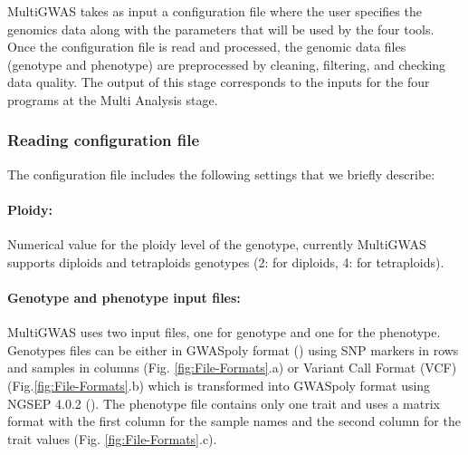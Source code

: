 \documentclass{article}
\begin{document}
MultiGWAS takes as input a configuration file where the user specifies the genomics data along with the parameters that will be used by the four tools. Once the configuration file is read and processed, the genomic data files (genotype and phenotype) are preprocessed by cleaning, filtering, and checking data quality. The output of this stage corresponds to the inputs for the four programs at the Multi Analysis stage.


\subsubsection{Reading configuration file\label{section-Reading-configuration-file}}

The configuration file includes the following settings that we briefly describe:%

\paragraph{{Ploidy:}} Numerical value for the ploidy level of the genotype, currently MultiGWAS supports diploids and tetraploids genotypes (2: for diploids, 4: for tetraploids).

\paragraph{{Genotype and phenotype input files:}}

MultiGWAS uses two input files, one for genotype and one for the phenotype. Genotypes files can be either in GWASpoly format (\cite{Rosyara2016}) using SNP markers in rows and samples in columns (Fig. \ref{fig:File-Formats}.a) or Variant Call Format (VCF) (Fig.\ref{fig:File-Formats}.b) which is transformed into GWASpoly format using NGSEP 4.0.2 (\cite{Duitama2019}). The phenotype file contains only one trait and uses a matrix format with the first column for the sample names and the second column for the trait values (Fig. \ref{fig:File-Formats}.c).
\end{document}
